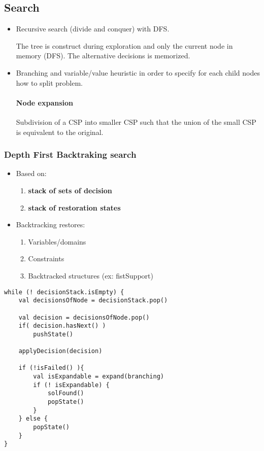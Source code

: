 \subsection{Search}
\begin{itemize}
    \item Recursive search (divide and conquer) with DFS.
        
        The tree is construct during exploration and only the current
        node in memory (DFS). The alternative decisions is memorized.

    \item Branching and variable/value heuristic
        in order to specify for each child nodes
        how to split problem.

        \paragraph{Node expansion}
        Subdivision of a CSP into smaller CSP such that the union of the small CSP
        is equivalent to the original.

\end{itemize}

\subsubsection{Depth First Backtraking search}

\begin{itemize}
    \item Based on:
    \begin{enumerate}
            \item \textbf{stack of sets of decision}
            \item \textbf{stack of restoration states}
        \end{enumerate}
    \item Backtracking restores:
        \begin{enumerate}
            \item Variables/domains
            \item Constraints
            \item Backtracked structures (ex: fistSupport)
        \end{enumerate}
\end{itemize}

\begin{lstlisting}[caption=Depth First backtracking search]
while (! decisionStack.isEmpty) {
    val decisionsOfNode = decisionStack.pop()

    val decision = decisionsOfNode.pop()
    if( decision.hasNext() )
        pushState()

    applyDecision(decision)

    if (!isFailed() ){
        val isExpandable = expand(branching)
        if (! isExpandable) {
            solFound()
            popState()
        }
    } else {
        popState()
    }
}
\end{lstlisting}



